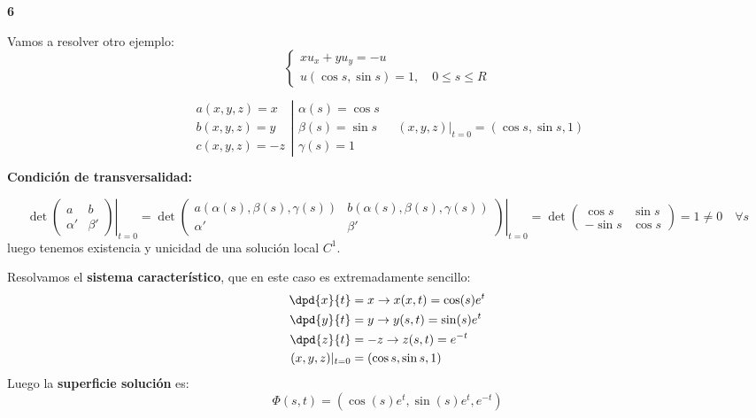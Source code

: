 	\begin{example}{\bf 6}

		Vamos a resolver otro ejemplo:
		\[
		\left\{
		\begin{array}{l}
			xu_x+ yu_y = -u\\
			u(\cos s, \sin s) = 1,\quad 0 \leq s \leq R
		\end{array}
		\right.
		\]

		\[ \left. \begin{array}{r}
		a(x,y,z) = x \\
		b(x,y,z) = y \\
		c(x,y,z) = -z
		\end{array} \right| \begin{array}{l}
		\alpha(s) = \cos s \\
		\beta(s) = \sin s \\
		\gamma(s) = 1 \end{array}
		\quad(x,y,z)|_{t=0} = (\cos s,\sin s,1)
		\]

		{\bf Condición de transversalidad:}

		\[\det \left. \begin{pmatrix}
			a & b \\
			\alpha' & \beta'
		\end{pmatrix} \right|_{t=0} =
		\det \left. \begin{pmatrix}
			a(\alpha(s), \beta(s), \gamma(s)) & b(\alpha(s), \beta(s), \gamma(s)) \\
			\alpha' & \beta'
		\end{pmatrix} \right|_{t=0} = \det \begin{pmatrix}
			\cos s & \sin s \\
			-\sin s & \cos s
		\end{pmatrix} = 1 \neq 0 \quad \forall s \]
		luego tenemos existencia y unicidad de una solución local $C^1$.

		Resolvamos el {\bf sistema característico}, que en este caso es extremadamente sencillo:
		\begin{align*}
			 \dpd{x}{t} &= x \rightarrow x(x,t) = \cos(s) e^t\\
			 \dpd{y}{t} &= y \rightarrow y(s,t) = \sin(s) e^t\\
			 \dpd{z}{t} &= -z \rightarrow z(s,t) = e^{-t}\\
			(x,y,z)|_{t=0} &= (\cos s,\sin s,1)
		\end{align*}
		Luego la {\bf superficie solución} es:
		\[\Phi(s,t) = (\cos(s) e^{t}, \sin(s) e^t, e^{-t})\]


\end{example}
